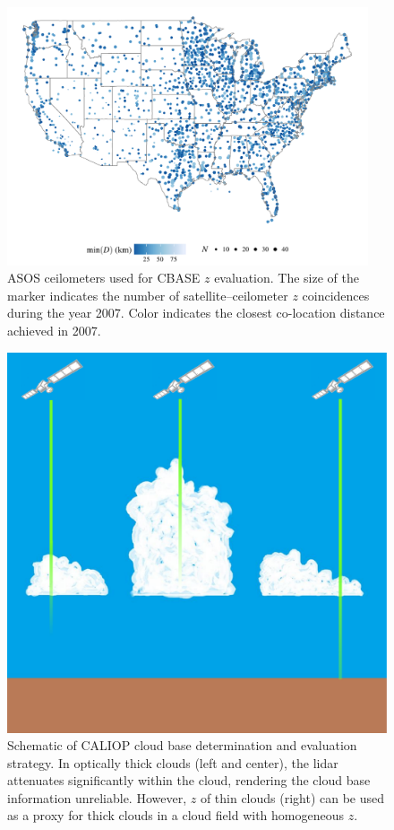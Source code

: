 \documentclass[essd,manuscript]{copernicus}\usepackage[]{graphicx}\usepackage[]{color}
\newenvironment{knitrout}{}{} %
\newcommand\CBH{\ensuremath{z}}
\begin{document}
\begin{figure}
  \centering
\begin{knitrout}
\color{fgcolor}

{\centering \includegraphics[width=0.95\textwidth]{figure/method-eval-asos-1} 

}



\end{knitrout}
  \caption{ASOS ceilometers used for CBASE \CBH{} evaluation.  The size of the
    marker indicates the number of satellite--ceilometer \CBH{} coincidences during
    the year 2007.  Color indicates the closest co-location distance achieved in
    2007.}
  \label{fig:asos}
\end{figure}

\begin{figure}
  \centering
  \includegraphics[width=0.5\linewidth,keepaspectratio=true]{CloudFieldCALIOP.pdf}
  \caption{Schematic of CALIOP cloud base determination and evaluation strategy.
    In optically thick clouds (left and center), the lidar attenuates
    significantly within the cloud, rendering the cloud base information
    unreliable.  However, \CBH{} of thin clouds (right) can be used as a proxy
    for thick clouds in a cloud field with homogeneous \CBH{}.}
  \label{fig:method}
\end{figure}
\end{document}
